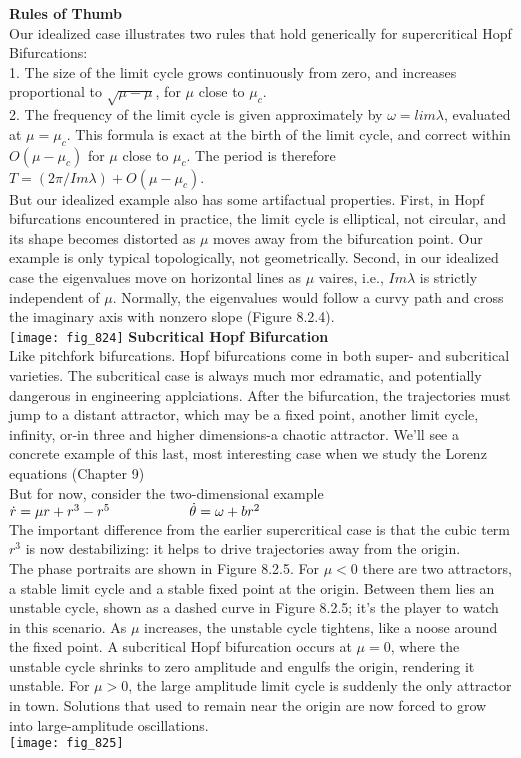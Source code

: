 \documentclass{article}
\newcommand\tab[1][1cm]{\hspace*{#1}}
\begin{document}
\textbf {Rules of Thumb} \\ \tab
Our idealized case illustrates two rules that hold generically for supercritical Hopf Bifurcations: \\ \tab
1. The size of the limit cycle grows continuously from zero, and increases proportional to $\sqrt{\mu - \mu}$, for $\mu$ close to $\mu_{c}$. \\
\tab 2. The frequency of the limit cycle is given approximately by $\omega = lim \lambda$, evaluated at $\mu=\mu_{c}$. This formula is exact at the birth of the limit cycle, and correct within $O(\mu -\mu_{c})$ for $\mu$ close to $\mu_{c}$. The period is therefore $T=(2\pi / Im \lambda)+O(\mu - \mu_{c})$. \\ \tab
But our idealized example also has some artifactual properties. First, in Hopf bifurcations encountered in practice, the limit cycle is elliptical, not circular, and its shape becomes distorted as $\mu$ moves away from the bifurcation point. Our example is only typical topologically, not geometrically. Second, in our idealized case the eigenvalues move on horizontal lines as $\mu$ vaires, i.e., $Im \lambda$ is strictly independent of $\mu$. Normally, the eigenvalues would follow a curvy path and cross the imaginary axis with nonzero slope (Figure 8.2.4). \\
\texttt{[image: fig\_824]} 
\textbf {Subcritical Hopf Bifurcation} \\ \tab
Like pitchfork bifurcations. Hopf bifurcations come in both super- and subcritical varieties. The subcritical case is always much mor edramatic, and potentially dangerous in engineering applciations. After the bifurcation, the trajectories must jump to a distant attractor, which may be a fixed point, another limit cycle, infinity, or-in three and higher dimensions-a chaotic attractor. We'll see a concrete example of this last, most interesting case when we study the Lorenz equations (Chapter 9) \\ \tab
But for now, consider the two-dimensional example \\ \tab \tab
$\dot{r}=\mu r + r^{3}-r^{5} \\ \tab \tab
\dot{\theta}=\omega + br^{2}$ \\ 
The important difference from the earlier supercritical case is that the cubic term $r^{3}$ is now destabilizing: it helps to drive trajectories away from the origin. \\ \tab
The phase portraits are shown in Figure 8.2.5. For $\mu < 0$ there are two attractors, a stable limit cycle and a stable fixed point at the origin. Between them lies an unstable cycle, shown as a dashed curve in Figure 8.2.5; it's the player to watch in this scenario. As $\mu$ increases, the unstable cycle tightens, like a noose around the fixed point. A subcritical Hopf bifurcation occurs at $\mu = 0$, where the unstable cycle shrinks to zero amplitude and engulfs the origin, rendering it unstable. For $\mu > 0$, the large amplitude limit cycle is suddenly the only attractor in town. Solutions that used to remain near the origin are now forced to grow into large-amplitude oscillations. \\
\texttt{[image: fig\_825]}
\end{document}
